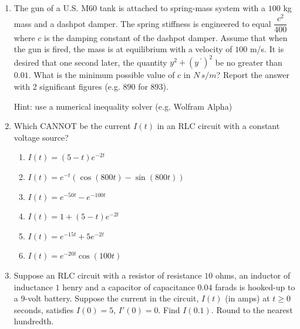 \documentclass{ximera}
\begin{document}
\begin{enumerate}[label=(\arabic*)]

\item The gun of a U.S. M60 tank is attached to spring-mass system with a $100$ kg mass and a dashpot damper.  The spring stiffness is engineered to equal $\dfrac{c^2}{400}$ where $c$ is the damping constant of the dashpot damper.  Assume that when the gun is fired, the mass is at equilibrium with a velocity of $100$ m/s.  It is desired that one second later, the quantity $y^2+(y\,^{\prime})^2$ be no greater than $0.01$.  What is the minimum possible value of $c$ in $N\,s/m$?  Report the answer with 2 significant figures (e.g. $890$ for $893$).

Hint: use a numerical inequality solver (e.g. Wolfram Alpha)
    
    
    

\item Which CANNOT be the current $I(t)$ in an RLC circuit with a constant voltage source?


\begin{enumerate}[label=(\alph*)]
\item $I(t)=(5-t)e^{-2t}$
\item $I(t)=e^{-t}\left(\cos{(800t)}-\sin{(800t)}\right)$
\item $I(t)=e^{-50t}-e^{-100t}$
\item $I(t)=1+(5-t)e^{-2t}$ %
\item $I(t)=e^{-15t}+5e^{-2t}$
\item $I(t)=e^{-20t}\cos{(100t)}$
\end{enumerate}


\item  Suppose an RLC circuit with a resistor of resistance $10$ ohms, an inductor of inductance $1$ henry and a capacitor of capacitance $0.04$ farads is hooked-up to a $9$-volt battery.  Suppose the current in the circuit, $I(t)$ (in amps) at $t\geq 0$ seconds, satisfies $I(0)=5$, $I'(0)=0$. Find $I(0.1)$.   Round to the nearest hundredth.



\end{enumerate}
\end{document}
